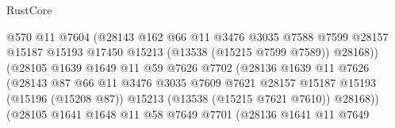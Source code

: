\begin{lexlean}{RustCore}
\begin{coremodule}
                                      @570
                                      @11
                                      @7604
                                      (@28143
                                        @162
                                        @66
                                        @11
                                        @3476
                                        @3035
                                        @7588
                                        @7599
                                        @28157
                                        @15187
                                        @15193
                                        @17450
                                        @15213
                                        (@13538 (@15215 @7599 @7589))
                                        @28168))
                                    (@28105
                                      @1639
                                      @1649
                                      @11
                                      @59
                                      @7626
                                      @7702
                                      (@28136
                                        @1639
                                        @11
                                        @7626
                                        (@28143
                                          @87
                                          @66
                                          @11
                                          @3476
                                          @3035
                                          @7609
                                          @7621
                                          @28157
                                          @15187
                                          @15193
                                          (@15196 (@15208 @87))
                                          @15213
                                          (@13538 (@15215 @7621 @7610))
                                          @28168))
                                      (@28105
                                        @1641
                                        @1648
                                        @11
                                        @58
                                        @7649
                                        @7701
                                        (@28136
                                          @1641
                                          @11
                                          @7649

\end{coremodule}
\end{lexlean}
